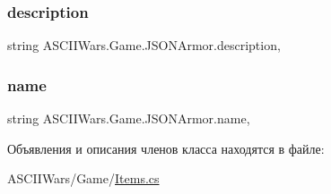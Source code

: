 \hypertarget{class_a_s_c_i_i_wars_1_1_game_1_1_j_s_o_n_armor_a078af0e88ca64ad7bad94897eb37ef0a}{}\label{class_a_s_c_i_i_wars_1_1_game_1_1_j_s_o_n_armor_a078af0e88ca64ad7bad94897eb37ef0a} 
\subsubsection{\texorpdfstring{description}{description}}
{\footnotesize\ttfamily string A\+S\+C\+I\+I\+Wars.\+Game.\+J\+S\+O\+N\+Armor.\+description\hspace{0.3cm}{\ttfamily [get]}, {\ttfamily [set]}}

\hypertarget{class_a_s_c_i_i_wars_1_1_game_1_1_j_s_o_n_armor_a5f29078c07ea3199d5e0e2aa48e5dd90}{}\label{class_a_s_c_i_i_wars_1_1_game_1_1_j_s_o_n_armor_a5f29078c07ea3199d5e0e2aa48e5dd90} 
\subsubsection{\texorpdfstring{name}{name}}
{\footnotesize\ttfamily string A\+S\+C\+I\+I\+Wars.\+Game.\+J\+S\+O\+N\+Armor.\+name\hspace{0.3cm}{\ttfamily [get]}, {\ttfamily [set]}}



Объявления и описания членов класса находятся в файле\+:\begin{DoxyCompactItemize}
\item 
A\+S\+C\+I\+I\+Wars/\+Game/\hyperlink{_items_8cs}{Items.\+cs}\end{DoxyCompactItemize}

